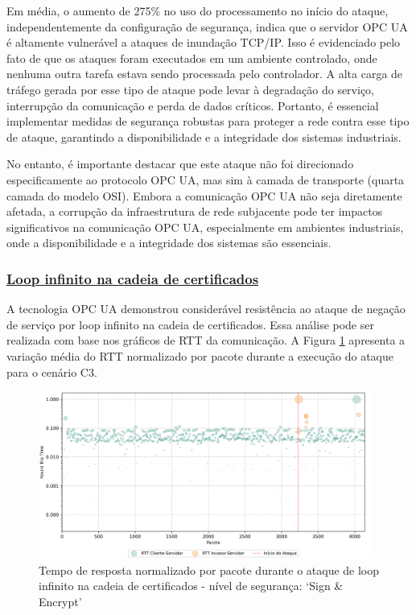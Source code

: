             Em média, o aumento de 275\% no uso do processamento no início do ataque, independentemente da configuração de segurança, indica que o servidor OPC UA é altamente vulnerável a ataques de inundação TCP/IP. Isso é evidenciado pelo fato de que os ataques foram executados em um ambiente controlado, onde nenhuma outra tarefa estava sendo processada pelo controlador. A alta carga de tráfego gerada por esse tipo de ataque pode levar à degradação do serviço, interrupção da comunicação e perda de dados críticos. Portanto, é essencial implementar medidas de segurança robustas para proteger a rede contra esse tipo de ataque, garantindo a disponibilidade e a integridade dos sistemas industriais.

            No entanto, é importante destacar que este ataque não foi direcionado especificamente ao protocolo OPC UA, mas sim à camada de transporte (quarta camada do modelo OSI). Embora a comunicação OPC UA não seja diretamente afetada, a corrupção da infraestrutura de rede subjacente pode ter impactos significativos na comunicação OPC UA, especialmente em ambientes industriais, onde a disponibilidade e a integridade dos sistemas são essenciais.

        \subsubsection*{\underline{Loop infinito na cadeia de certificados}}

            A tecnologia OPC UA demonstrou considerável resistência ao ataque de negação de serviço por loop infinito na cadeia de certificados. Essa análise pode ser realizada com base nos gráficos de RTT da comunicação. A Figura \ref{fig:0-dos-cert-rttp} apresenta a variação média do RTT normalizado por pacote durante a execução do ataque para o cenário C3.

            \begin{figure}[htbp!]
                \caption{\label{fig:0-dos-cert-rttp}Tempo de resposta normalizado por pacote durante o ataque de loop infinito na cadeia de certificados - nível de segurança: `Sign \& Encrypt'}
                \begin{center}
                    \includegraphics[width=0.972\textwidth]{USPSC-img/output/cropped/2-dos_certificate_inf_chain_loop-rttp.png}
                \end{center}
            \end{figure}

